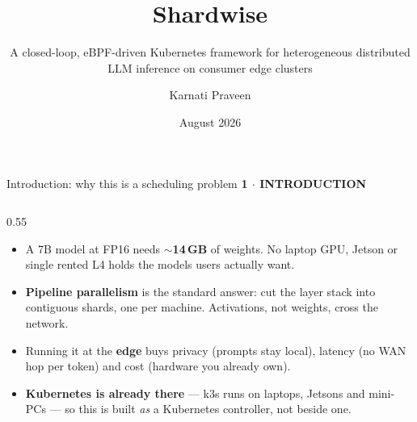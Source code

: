\documentclass[aspectratio=169,9pt]{beamer}
\title{Shardwise}
\subtitle{A closed-loop, eBPF-driven Kubernetes framework for heterogeneous
distributed LLM inference on consumer edge clusters}
\author{Karnati Praveen}
\institute{\texttt{github.com/karnati-praveen/ebpf-}}
\date{August 2026}
\newcommand{\kicker}[1]{{\scriptsize\color{keBlue}\bfseries\MakeUppercase{#1}}\par\vspace{0.2em}}
\newcommand{\hl}[1]{\textbf{\color{keNavy}#1}}
\begin{document}

\begin{frame}[shrink=25]{Introduction: why this is a scheduling problem}
  \kicker{1 $\cdot$ Introduction}
  \small
  \begin{columns}[T]
    \begin{column}{0.55\textwidth}
      \begin{itemize}\setlength\itemsep{0.45em}
        \item A 7B model at FP16 needs ${\sim}$\hl{14\,GB} of weights. No laptop
          GPU, Jetson or single rented L4 holds the models users actually want.
        \item \hl{Pipeline parallelism} is the standard answer: cut the layer
          stack into contiguous shards, one per machine. Activations, not
          weights, cross the network.
        \item Running it at the \hl{edge} buys privacy (prompts stay local),
          latency (no WAN hop per token) and cost (hardware you already own).
        \item \hl{Kubernetes is already there} --- k3s runs on laptops, Jetsons
          and mini-PCs --- so this is built \emph{as} a Kubernetes controller,
          not beside one.
      \end{itemize}
      \vspace{0.5em}
      \centering
\end{column}
\end{columns}
\end{frame}
\end{document}
